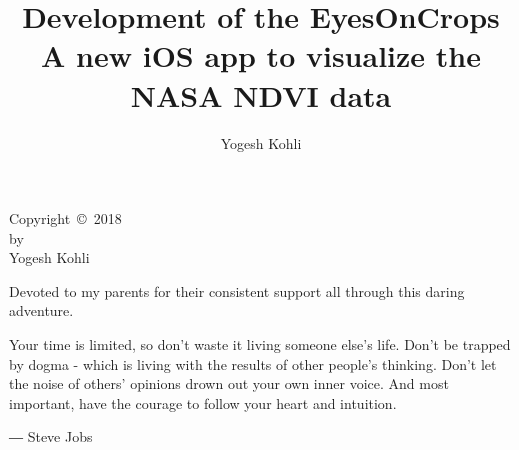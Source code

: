\documentclass{sdsu-thesis}
\author{Yogesh Kohli}
\title{Development of the EyesOnCrops \\
A new iOS app to visualize the NASA NDVI data}
\theoremstyle{dtm}
\begin{document}
\maketitle

\makesignature

\begin{copyrightpage}
  Copyright~\copyright~2018 \\
  by \\
  Yogesh Kohli
\end{copyrightpage}

% 
\begin{dedication}
  \vspace{3in}
  \centering
  Devoted to my parents for their consistent support all through this daring adventure.
\end{dedication}

% 
\begin{epigraph}
Your time is limited, so don't waste it living someone else's life. Don't be trapped by dogma - which is living with the results of other people's thinking. Don't let the noise of others' opinions drown out your own inner voice. And most important, have the courage to follow your heart and intuition.
\begin{center}
    ― Steve Jobs
\end{center}
\end{epigraph}

\begin{abstract}
  
\end{abstract}

\tableofcontents

\listoftables
\listoffigures
\end{document}
